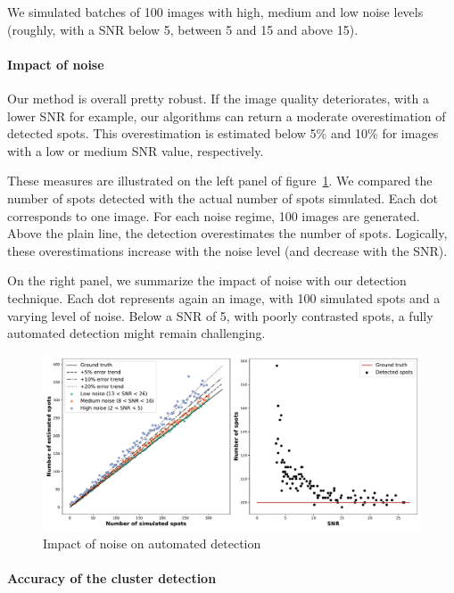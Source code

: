 We simulated batches of 100 images with high, medium and low noise levels (roughly, with a \ac{SNR} below 5, between 5 and 15 and above 15).

\paragraph{Impact of noise}

Our method is overall pretty robust.
If the image quality deteriorates, with a lower \ac{SNR} for example, our algorithms can return a moderate overestimation of detected spots.
This overestimation is estimated below 5\% and 10\% for images with a low or medium \ac{SNR} value, respectively.

These measures are illustrated on the left panel of figure~\ref{fig:detection_error}.
We compared the number of spots detected with the actual number of spots simulated.
Each dot corresponds to one image.
For each noise regime, 100 images are generated.
Above the plain line, the detection overestimates the number of spots.
Logically, these overestimations increase with the noise level (and decrease with the \ac{SNR}).

On the right panel, we summarize the impact of noise with our detection technique.
Each dot represents again an image, with 100 simulated spots and a varying level of noise.
Below a \ac{SNR} of 5, with poorly contrasted spots, a fully automated detection might remain challenging.

\begin{figure}[h]
    \centering
    \includegraphics[width=1\textwidth]{figures/chapter2/fused_spot_detection_noise}
    \caption{Impact of noise on automated detection}
    \label{fig:detection_error}
\end{figure}

\paragraph{Accuracy of the cluster detection}

